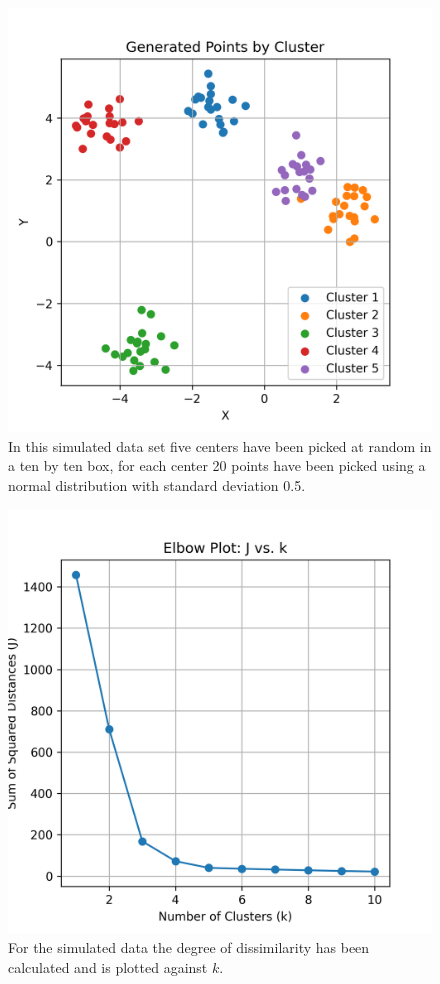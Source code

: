 \documentclass[12pt]{article}
\begin{document}
\begin{figure}[htb]
\begin{center}  
  \includegraphics{04.2_points.png}
\end{center}
\caption{In this simulated data set five centers have been picked at random in a ten by ten box, for each center 20 points have been picked using a normal distribution with standard deviation 0.5.\label{fig:points}}
\end{figure}



\begin{figure}[htb]
\begin{center}  
  \includegraphics{04.2_J.png}
\end{center}
\caption{For the simulated data the degree of dissimilarity has been
  calculated and is plotted against $k$.\label{fig:J}}
\end{figure}
\end{document}
